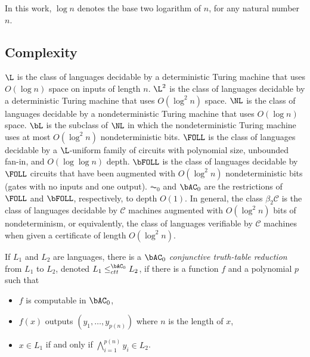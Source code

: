 \documentclass{article}
\begin{document}
In this work, $\log n$ denotes the base two logarithm of $n$, for any natural number $n$.

\subsection{Complexity}

$\L$ is the class of languages decidable by a deterministic Turing machine that uses $O(\log n)$ space on inputs of length $n$.
$\L^2$ is the class of languages decidable by a deterministic Turing machine that uses $O(\log^2 n)$ space.
$\NL$ is the class of languages decidable by a nondeterministic Turing machine that uses $O(\log n)$ space.
$\bL$ is the subclass of $\NL$ in which the nondeterministic Turing machine uses at most $O(\log^2 n)$ nondeterministic bits.
$\FOLL$ is the class of languages decidable by a $\L$-uniform family of circuits with polynomial size, unbounded fan-in, and $O(\log \log n)$ depth.
$\bFOLL$ is the class of languages decidable by $\FOLL$ circuits that have been augmented with $O(\log^2 n)$ nondeterministic bits (gates with no inputs and one output).
$\AC_0$ and $\bAC_0$ are the restrictions of $\FOLL$ and $\bFOLL$, respectively, to depth $O(1)$.
In general, the class $\beta_2 \mathcal{C}$ is the class of languages decidable by $\mathcal{C}$ machines augmented with $O(\log^2 n)$ bits of nondeterminism, or equivalently, the class of languages verifiable by $\mathcal{C}$ machines when given a certificate of length $O(\log^2 n)$.

If $L_1$ and $L_2$ are languages, there is a \emph{$\bAC_0$ conjunctive truth-table reduction} from $L_1$ to $L_2$, denoted $L_1 \leq^{\bAC_0}_{ctt} L_2$, if there is a function $f$ and a polynomial $p$ such that
\begin{itemize}
\item $f$ is computable in $\bAC_0$,
\item $f(x)$ outputs $(y_1, \dotsc, y_{p(n)})$ where $n$ is the length of $x$,
\item $x \in L_1$ if and only if $\bigwedge_{i = 1}^{p(n)} y_i \in L_2$.
\end{itemize}
\end{document}
